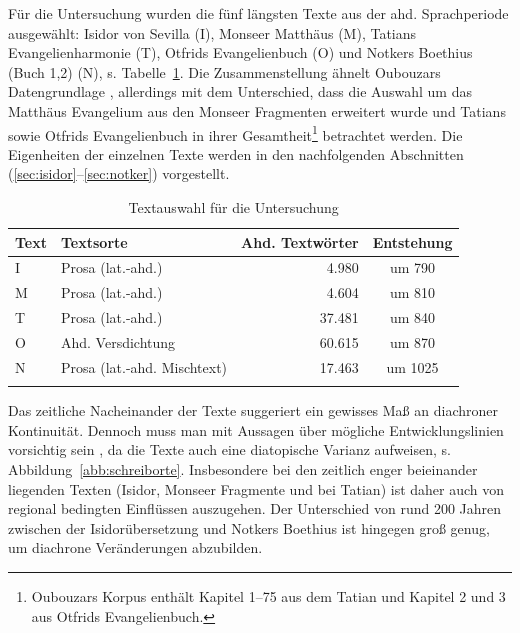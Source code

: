 Für die Untersuchung wurden die fünf längsten Texte aus der ahd. Sprachperiode ausgewählt: Isidor von Sevilla (I), Monseer Matthäus (M), Tatians Evangelienharmonie (T), Otfrids Evangelienbuch (O) und Notkers Boethius (Buch 1,2) (N), s. Tabelle~\ref{tab:ddd-auswahl}. Die Zusammenstellung ähnelt Oubouzars Datengrundlage \parencite[41-42]{Oubouzar1989}, allerdings mit dem Unterschied, dass die Auswahl um das Matthäus Evangelium aus den Monseer Fragmenten erweitert wurde und Tatians sowie Otfrids Evangelienbuch in ihrer Gesamtheit\footnote{Oubouzars Korpus enthält Kapitel 1--75 aus dem Tatian und Kapitel 2 und 3 aus Otfrids Evangelienbuch.} betrachtet werden.  Die Eigenheiten der einzelnen Texte werden in den nachfolgenden Abschnitten (\ref{sec:isidor}--\ref{sec:notker}) vorgestellt.

\begin{table}
\centering

\begin{tabular}{llrc}
\lsptoprule
Text                  & Textsorte      & Ahd. Textwörter & Entstehung \\ \midrule
I                      & Prosa (lat.-ahd.)          &   4.980                  & um 790       \\
M         & Prosa (lat.-ahd.)          & 4.604            & um 810              \\
T & Prosa (lat.-ahd.)          & 37.481                  & um 840              \\
O     & Ahd. Versdichtung          & 60.615               & um 870              \\
N   & Prosa (lat.-ahd. Mischtext) &  17.463               & um 1025             \\ \lspbottomrule
\end{tabular}
\caption{Textauswahl für die Untersuchung}
\label{tab:ddd-auswahl}
\end{table}

Das zeitliche Nacheinander der Texte suggeriert ein gewisses Maß an diachroner Kontinuität. Dennoch muss man mit Aussagen über mögliche Entwicklungslinien  vorsichtig sein \parencite[vgl. hierzu auch][158]{Leiss2000}, da die Texte auch eine diatopische Varianz aufweisen, s. Abbildung~\ref{abb:schreiborte}. Insbesondere bei den zeitlich enger beieinander liegenden Texten (Isidor, Monseer Fragmente und bei Tatian) ist daher auch von regional bedingten Einflüssen auszugehen. Der Unterschied von rund 200 Jahren zwischen der Isidorübersetzung und Notkers Boethius ist hingegen groß genug, um diachrone Veränderungen abzubilden.

